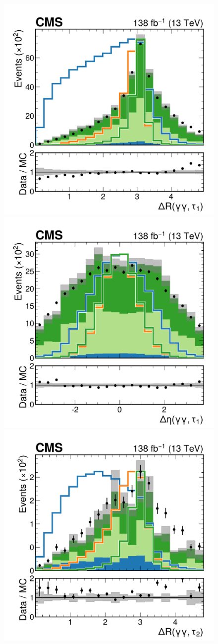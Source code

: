 \begin{figure}
    \centering
    \includegraphics[width=.49\linewidth]{Figures/Dihiggs/categorisation/input_features/Graviton/Scale_equal/Diphoton_lead_lepton_dR_GluGluToBulkGravitonToHHTo2G2Tau_M-1000_linear.pdf}
    \includegraphics[width=.49\linewidth]{Figures/Dihiggs/categorisation/input_features/Graviton/Scale_equal/Diphoton_lead_lepton_deta_GluGluToBulkGravitonToHHTo2G2Tau_M-1000_linear.pdf} \\
    \includegraphics[width=.49\linewidth]{Figures/Dihiggs/categorisation/input_features/Graviton/Scale_equal/Diphoton_sublead_lepton_dR_GluGluToBulkGravitonToHHTo2G2Tau_M-1000_linear.pdf} 

\end{figure}
